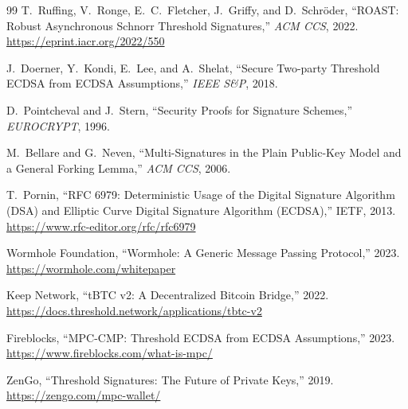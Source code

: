\begin{thebibliography}{99}
T.~Ruffing, V.~Ronge, E.~C.~Fletcher, J.~Griffy, and D.~Schr\"oder,
``ROAST: Robust Asynchronous Schnorr Threshold Signatures,''
\textit{ACM CCS}, 2022.
\url{https://eprint.iacr.org/2022/550}

J.~Doerner, Y.~Kondi, E.~Lee, and A.~Shelat,
``Secure Two-party Threshold ECDSA from ECDSA Assumptions,''
\textit{IEEE S\&P}, 2018.

D.~Pointcheval and J.~Stern,
``Security Proofs for Signature Schemes,''
\textit{EUROCRYPT}, 1996.

M.~Bellare and G.~Neven,
``Multi-Signatures in the Plain Public-Key Model and a General Forking Lemma,''
\textit{ACM CCS}, 2006.

T.~Pornin,
``RFC 6979: Deterministic Usage of the Digital Signature Algorithm (DSA) and
Elliptic Curve Digital Signature Algorithm (ECDSA),''
IETF, 2013.
\url{https://www.rfc-editor.org/rfc/rfc6979}

Wormhole Foundation,
``Wormhole: A Generic Message Passing Protocol,''
2023.
\url{https://wormhole.com/whitepaper}

Keep Network,
``tBTC v2: A Decentralized Bitcoin Bridge,''
2022.
\url{https://docs.threshold.network/applications/tbtc-v2}

Fireblocks,
``MPC-CMP: Threshold ECDSA from ECDSA Assumptions,''
2023.
\url{https://www.fireblocks.com/what-is-mpc/}

ZenGo,
``Threshold Signatures: The Future of Private Keys,''
2019.
\url{https://zengo.com/mpc-wallet/}

\end{thebibliography}


